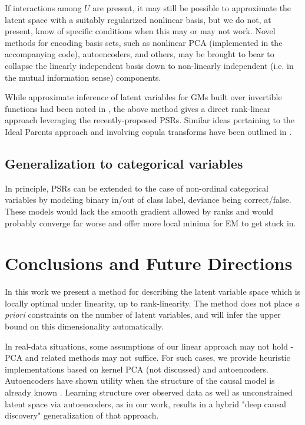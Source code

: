 \documentclass{article}
\begin{document}
If interactions among $U$ are present, it may still be possible to approximate the latent space with a suitably regularized nonlinear basis, but we do not, at present, know of specific conditions when this may or may not work.  Novel methods for encoding basis sets, such as nonlinear PCA (implemented in the accompanying code), autoencoders, and others, may be brought to bear to collapse the linearly independent basis down to non-linearly independent (i.e. in the mutual information sense) components.

While approximate inference of latent variables for GMs built over invertible functions had been noted in \cite{elidan_ideal_2007}, the above method gives a direct rank-linear approach leveraging the recently-proposed PSRs.  Similar ideas pertaining to the Ideal Parents approach and involving copula transforms have been outlined in \cite{tenzer_generalized_2016}.

\subsection{Generalization to categorical variables}
In principle, PSRs can be extended to the case of non-ordinal categorical variables by modeling binary in/out of class label, deviance being correct/false.  These models would lack the smooth gradient allowed by ranks and would probably converge far worse and offer more local minima for EM to get stuck in.  

\section{Conclusions and Future Directions}
In this work we present a method for describing the latent variable space which is locally optimal under linearity, up to rank-linearity.  The method does not place \textit{a priori} constraints on the number of latent variables, and will infer the upper bound on this dimensionality automatically.  

In real-data situations, some assumptions of our linear approach may not hold - PCA and related methods may not suffice.  For such cases, we provide heuristic implementations based on kernel PCA (not discussed) and autoencoders.  Autoencoders have shown utility when the structure of the causal model is already known \cite{louizos_causal_2017}.  Learning structure over observed data as well as unconstrained latent space via autoencoders, as in our work, results in a hybrid "deep causal discovery" generalization of that approach.  
\end{document}
